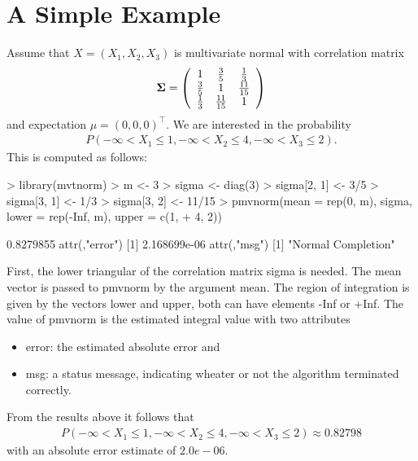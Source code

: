 \documentclass[11pt]{amsart}
\newcommand{\Sig}{\mbox{\boldmath $\Sigma$}}
\begin{document}
\section{A Simple Example \label{simple}}

Assume that $ X = (X_1, X_2, X_3) $ is multivariate normal with correlation
matrix
\begin{eqnarray*}
\Sig = \left( \begin{array}{ccc} 1 & \frac{3}{5} & \frac{1}{3} \\
\frac{3}{5} & 1 & \frac{11}{15} \\
\frac{1}{3} & \frac{11}{15} & 1 \end{array} \right)
\end{eqnarray*}
and expectation $ \mu = (0,0,0)^{\top} $. We are interested in the probability
\begin{eqnarray*}
P(-\infty < X_1 \le 1, -\infty < X_2 \le 4, -\infty < X_3 \le 2).
\end{eqnarray*}
This is computed as follows:
\begin{Schunk}
\begin{Sinput}
> library(mvtnorm)
> m <- 3
> sigma <- diag(3)
> sigma[2, 1] <- 3/5
> sigma[3, 1] <- 1/3
> sigma[3, 2] <- 11/15
> pmvnorm(mean = rep(0, m), sigma, lower = rep(-Inf, m), upper = c(1, 
+     4, 2))
\end{Sinput}
\begin{Soutput}
[1] 0.8279855
attr(,"error")
[1] 2.168699e-06
attr(,"msg")
[1] "Normal Completion"
\end{Soutput}
\end{Schunk}
First, the lower triangular of the correlation matrix {\ttfamily sigma}
is needed. The mean
vector is passed to {\ttfamily pmvnorm} by the argument {\ttfamily mean}.
The region of
integration is given by the vectors {\ttfamily lower} and {\ttfamily upper},
both can have elements {\ttfamily -Inf} or {\ttfamily +Inf}. The value of {\ttfamily pmvnorm}
is the estimated integral value with two attributes 
\begin{itemize}
\item {\ttfamily error}: the estimated absolute error and
\item {\ttfamily msg}: a status message, indicating wheater or not the algorithm
terminated correctly.
\end{itemize}
From the results above it follows that
\begin{eqnarray*}
P(-\infty < X_1 \le 1, -\infty < X_2 \le 4, -\infty < X_3 \le 2) \approx
0.82798
\end{eqnarray*}
with an absolute error estimate of $2.0e-06$.
\end{document}
